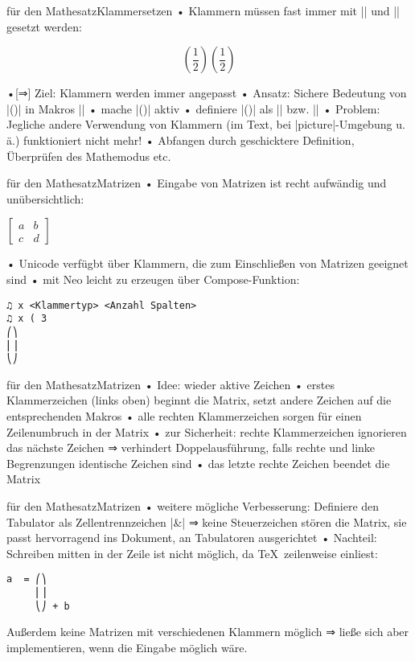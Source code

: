 \documentclass[t]{beamer}
\begin{document}
\begin{frame}[fragile]{\altTeX für den Mathesatz}{Klammersetzen}
• Klammern müssen fast immer mit |\left| und |\right| gesetzt werden:
\•
\begin{LTXexample}
\[(\frac 12) \left(\frac 12 \right)\]
\end{LTXexample}
•[⇒] Ziel: Klammern werden immer angepasst
• Ansatz: Sichere Bedeutung von |()| in Makros |\openbrace \closebrace|
• mache |()| aktiv
• definiere |()| als |\left\openbrace| bzw. |\right\openbrace|\pause
• Problem: Jegliche andere Verwendung von Klammern (im Text, bei |picture|-Umgebung u.\,ä.) funktioniert nicht mehr!
• Abfangen durch geschicktere Definition, Überprüfen des Mathemodus etc.
\•
\end{frame}

\begin{frame}[fragile]{\altTeX für den Mathesatz}{Matrizen}
• Eingabe von Matrizen ist recht aufwändig und unübersichtlich:
\•
\begin{LTXexample}
$\begin{bmatrix} a & b \\ c & d \end{bmatrix}$
\end{LTXexample}
• Unicode verfügbt über Klammern, die zum Einschließen von Matrizen geeignet sind
• mit Neo leicht zu erzeugen über Compose-Funktion:
\•
\begin{verbatim}
♫ x <Klammertyp> <Anzahl Spalten>
♫ x ( 3
⎛⎞
⎜⎟
⎝⎠
\end{verbatim}
\end{frame}


\begin{frame}[fragile]{\altTeX für den Mathesatz}{Matrizen}
• Idee: wieder aktive Zeichen
• erstes Klammerzeichen (links oben) beginnt die Matrix, setzt andere Zeichen auf die entsprechenden Makros
• alle rechten Klammerzeichen sorgen für einen Zeilenumbruch in der Matrix
• zur Sicherheit: rechte Klammerzeichen ignorieren das nächste Zeichen ⇒ verhindert Doppelausführung, falls rechte und linke Begrenzungen identische Zeichen sind
• das letzte rechte Zeichen beendet die Matrix
\•
\end{frame}

\begin{frame}[fragile]{\altTeX für den Mathesatz}{Matrizen}
• weitere mögliche Verbesserung: Definiere den Tabulator als Zellentrennzeichen |&| ⇒ keine Steuerzeichen stören die Matrix, sie passt hervorragend ins Dokument, an Tabulatoren ausgerichtet\pause
• Nachteil: Schreiben mitten in der Zeile ist nicht möglich, da \TeX\ zeilenweise einliest:
\•
\begin{verbatim}
a  = ⎛⎞
     ⎜⎟
     ⎝⎠ + b
\end{verbatim}
Außerdem keine Matrizen mit verschiedenen Klammern möglich ⇒ ließe sich aber implementieren, wenn die Eingabe möglich wäre.
\end{frame}
\end{document}
